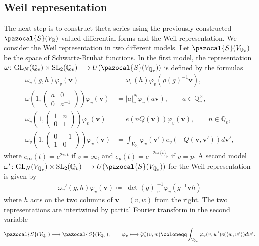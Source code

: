 \documentclass[twoside,a4paper,10pt]{article} %
\newcommand{\8}{\infty}
\newcommand{\vbf}{\mathbf{v}}
\newcommand{\SL}{\mathrm{SL}}
\newcommand{\GL}{\mathrm{GL}}
\newcommand{\R}{\mathbb{R}}
\newcommand{\Q}{\mathbb{Q}}
\newcommand{\Scal}{\pazocal{S}}
\theoremstyle{mytheoremstyle}
\theoremstyle{remark}
\numberwithin{equation}{section}
\begin{document}
\subsection{Weil representation} The next step is to construct theta series using the previously constructed $\Scal(V_\R)$-valued differential forms and the Weil representation. We consider the Weil representation in two different models. Let $\Scal(V_{\Q_v})$ be the space of Schwartz-Bruhat functions. In the first model, the representation $\omega \colon \GL_N(\Q_v) \times \SL_2(\Q_v) \longrightarrow U(\Scal(V_{\Q_v}))$ is defined by the formulas
\begin{align*}
\omega_v\left (g, h \right ) \varphi_v(\vbf)&=\omega_v(h)\varphi_v(\rho(g)^{-1}\vbf), \\
    \omega\left (1, \begin{pmatrix}
        a & 0 \\ 0 & a^{-1}
    \end{pmatrix} \right ) \varphi_v(\vbf)&=\vert a \vert_v^N \varphi_v(a\vbf), \qquad a \in \Q_v^\times, \\
    \omega_v\left (1, \begin{pmatrix}
        1 & n \\ 0 & 1
    \end{pmatrix} \right ) \varphi_v(\vbf)&=e \left ( nQ(\vbf) \right ) \varphi_v(\vbf), \qquad n \in \Q_v, \\
    \omega_v\left (1, \begin{pmatrix}
        0 & -1 \\ 1 & 0
    \end{pmatrix} \right ) \varphi_v(\vbf)&= \int_{V_{\Q_v}} \varphi_v(\vbf') e_v \left (- Q(\vbf,\vbf') \right )d\vbf',
\end{align*}
where $e_\8(t)=e^{2i\pi t}$ if $v=\8$, and $e_p(t)=e^{-2i\pi \{t\}_p}$ if $v=p$. A second model $\omega' \colon \GL_N(V_{\Q_v}) \times \SL_2(\Q_v) \longrightarrow U(\Scal(V_{\Q_v}))$ for the Weil representation is given by
\begin{align}
    \omega_v'(g,h)\varphi_v(\vbf)\coloneqq \vert \det(g)\vert_v^{-1}\varphi_v(g^{-1}\vbf h)
\end{align}
where $h$ acts on the two columns of $\vbf=(v,w)$ from the right. The two representations are intertwined by partial Fourier transform in the second variable
\begin{align}
    \Scal(V_{\Q_v}) \longrightarrow \Scal(V_{\Q_v}), \qquad \varphi_v \longmapsto \widehat{\varphi_v}(v,w) \coloneqq \int_{V_{\Q_v}} \varphi_v(v,w') e(\langle w,w' \rangle)dw'.
\end{align}
\end{document}
